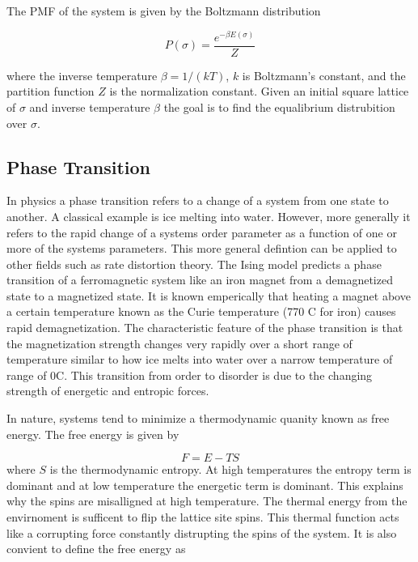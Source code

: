 \documentclass{article}
\begin{document}
The PMF of the system is given by the Boltzmann distribution

\begin{equation}
    P(\sigma) = \frac{e^{-\beta E(\sigma)}}{Z}
\end{equation}

where the inverse temperature $\beta = 1/(kT)$, $k$ is Boltzmann's constant, and the partition function $Z$ is the normalization constant.
Given an initial square lattice of $\sigma$ and inverse temperature $\beta$ the goal is to find the equalibrium distrubition over $\sigma$.


\subsection{Phase Transition}
In physics a phase transition refers to a change of a system from one state to another. A classical example is ice melting into water.
However, more generally it refers to the rapid change of a systems order parameter as a function of one or more of the systems parameters. 
This more general defintion can be applied to other fields such as rate distortion theory. The Ising model predicts a phase transition of a ferromagnetic system like an iron magnet from a demagnetized state to a magnetized state. 
It is known emperically that heating a magnet above a certain temperature known as the Curie temperature (770 \degree C for iron) causes rapid
demagnetization. The characteristic feature of the phase transition is that the magnetization strength changes very rapidly over a short range of temperature
similar to how ice melts into water over a narrow temperature of range of 0\degree C. This transition from order to disorder is due to the changing strength of
energetic and entropic forces.

In nature, systems tend to minimize a thermodynamic quanity known as free energy. The free energy is given by

\begin{equation}\label{eq:eq1}
    F = E - TS
\end{equation}
where $S$ is the thermodynamic entropy. At high temperatures the entropy term is dominant and at low temperature the energetic term is dominant.
This explains why the spins are misalligned at high temperature. The thermal energy from the envirnoment is sufficent to flip the lattice site spins.
This thermal function acts like a corrupting force constantly distrupting the spins of the system. It is also convient to define the free energy as
\end{document}
